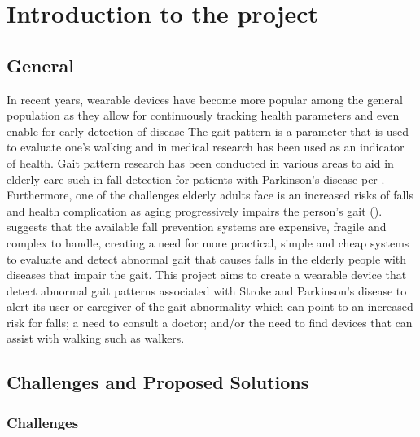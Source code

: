 %
%
%
%

\chapter{Introduction to the project}

\section{General}

In recent years, wearable devices have become more popular among the general population as they allow for continuously tracking health parameters and even enable for early detection of disease \cite{Sreenilayam:2020}The gait pattern is a parameter that is used to evaluate one’s walking and in medical research has been used as an indicator of health. Gait pattern research has been conducted in various areas to aid in elderly care such in fall detection for patients with Parkinson’s disease per \cite{Perezsiguas:2023}.
Furthermore, one of the challenges elderly adults face is an increased risks of falls and health complication as aging progressively impairs the person’s gait (\cite{Perezsiguas:2023}). \cite{Perezsiguas:2023} suggests that the available fall prevention systems are expensive, fragile and complex to handle, creating a need for more practical, simple and cheap systems to evaluate and detect abnormal gait that causes falls in the elderly people with diseases that impair the gait.
This project aims to create a wearable device that detect abnormal gait patterns associated with Stroke and Parkinson’s disease to alert its user or caregiver of the gait abnormality which can point to an increased risk for falls; a need to consult a doctor; and/or the need to find devices that can assist with walking such as walkers.




\bigskip


\section{Challenges and Proposed Solutions}

\subsection{Challenges}

